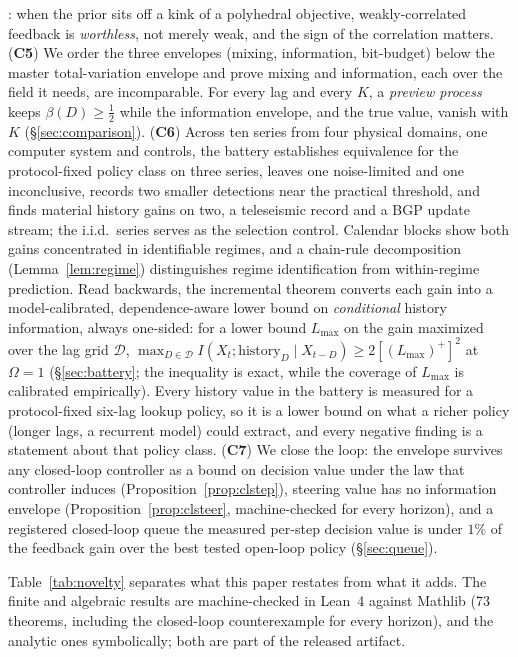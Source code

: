 \documentclass[11pt]{article}
\begin{document}
\cite{radnerstiglitz84,chadeschlee02}: when the prior sits off a kink of a polyhedral
objective, weakly-correlated feedback is \emph{worthless}, not merely weak,
and the sign of the correlation matters. (\textbf{C5}) We order the three
envelopes (mixing, information, bit-budget) below the master
total-variation envelope and prove mixing and information, each over the
field it needs, are incomparable.
For every lag and every $K$, a \emph{preview process} keeps
$\beta(D)\ge\tfrac12$ while the information envelope, and the true value,
vanish with $K$ (\S\ref{sec:comparison}). (\textbf{C6}) Across ten
series from four physical domains, one computer system and controls, the
battery establishes equivalence for the protocol-fixed policy class on
three series, leaves one noise-limited and one inconclusive, records two
smaller detections near the practical threshold, and finds material
history gains on two, a teleseismic record and a BGP update stream; the
i.i.d.\ series serves as the selection control. Calendar blocks show both gains
concentrated in identifiable regimes, and a chain-rule decomposition
(Lemma~\ref{lem:regime}) distinguishes regime identification from
within-regime prediction. Read backwards, the incremental theorem
converts each gain into a model-calibrated, dependence-aware lower bound
on \emph{conditional} history information, always one-sided: for a lower
bound $L_{\max}$ on the gain maximized over the lag grid $\mathcal D$,
$\max_{D\in\mathcal D}I(X_t;\text{history}_D\mid X_{t-D})\ge
2[(L_{\max})^{+}]^2$ at $\Omega=1$ (\S\ref{sec:battery}; the inequality is
exact, while the coverage of $L_{\max}$ is calibrated empirically). Every history value in the battery is measured for
a protocol-fixed six-lag lookup policy, so it is a lower bound on what a
richer policy (longer lags, a recurrent model) could extract, and every
negative finding is a statement about that policy class. (\textbf{C7}) We
close the loop: the envelope survives any closed-loop controller as a
bound on decision value under the law that controller induces
(Proposition~\ref{prop:clstep}), steering value has no information envelope
(Proposition~\ref{prop:clsteer}, machine-checked for every horizon), and a
registered closed-loop queue the measured per-step decision value is under
$1\%$ of the feedback gain over the best tested open-loop policy
(\S\ref{sec:queue}).

Table~\ref{tab:novelty} separates what this paper restates from what it adds. The
finite and algebraic results are machine-checked in Lean~4 against Mathlib
(73 theorems, including the closed-loop counterexample for every horizon),
and the analytic ones symbolically; both are part of the
released artifact.
\end{document}
